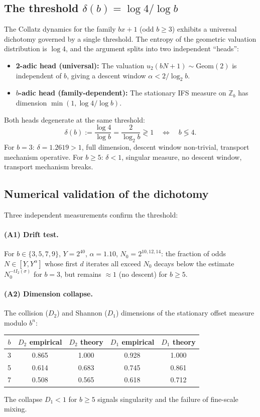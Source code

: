 \documentclass[12pt,a4paper]{article}
\theoremstyle{remark}
\begin{document}
\subsection{The threshold $\delta(b) = \log 4 / \log b$}
The Collatz dynamics for the family $bx+1$ (odd $b \ge 3$) exhibits a universal
dichotomy governed by a single threshold. The entropy of the geometric valuation
distribution is $\log 4$, and the argument splits into two independent ``heads'':
\begin{itemize}
\item \textbf{2-adic head (universal):} The valuation $
u_2(bN+1) \sim \mathrm{Geom}(2)$
is independent of $b$, giving a descent window $\alpha < 2/\log_2 b$.
\item \textbf{$b$-adic head (family-dependent):} The stationary IFS measure on
$\mathbb{Z}_b$ has dimension $\min(1, \log 4 / \log b)$.
\end{itemize}
Both heads degenerate at the same threshold:
\[
\delta(b) := \frac{\log 4}{\log b} = \frac{2}{\log_2 b} \gtrless 1
\quad \Longleftrightarrow \quad b \lessgtr 4.
\]
For $b=3$: $\delta = 1.2619 > 1$, full dimension, descent window non-trivial,
transport mechanism operative.
For $b \ge 5$: $\delta < 1$, singular measure, no descent window, transport
mechanism breaks.
\subsection{Numerical validation of the dichotomy}
Three independent measurements confirm the threshold:
\paragraph{(A1) Drift test.} For $b \in \{3, 5, 7, 9\}$, $Y = 2^{40}$,
$\alpha = 1.10$, $N_0 = 2^{10,12,14}$: the fraction of odds $N \in [Y, Y^\alpha]$
whose first $d$ iterates all exceed $N_0$ decays below the estimate
$N_0^{-t I_2(\sigma)}$ for $b=3$, but remains $\approx 1$ (no descent) for $b \ge 5$.
\paragraph{(A2) Dimension collapse.} The collision ($D_2$) and Shannon ($D_1$)
dimensions of the stationary offset measure modulo $b^n$:
\begin{center}
\begin{tabular}{c|cc|cc}
$b$ & $D_2$ empirical & $D_2$ theory & $D_1$ empirical & $D_1$ theory \\ \hline
3 & 0.865 & 1.000 & 0.928 & 1.000 \\
5 & 0.614 & 0.683 & 0.745 & 0.861 \\
7 & 0.508 & 0.565 & 0.618 & 0.712 \\
\end{tabular}
\end{center}
The collapse $D_1 < 1$ for $b \ge 5$ signals singularity and the failure of
fine-scale mixing.
\end{document}
